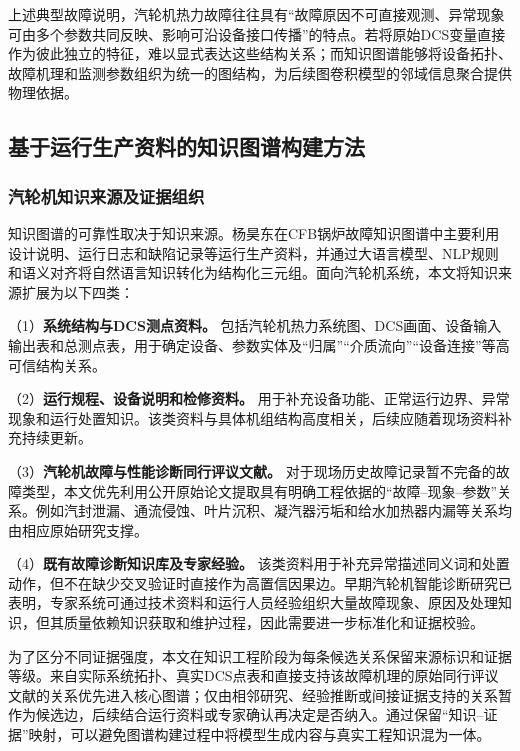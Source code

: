 上述典型故障说明，汽轮机热力故障往往具有“故障原因不可直接观测、异常现象可由多个参数共同反映、影响可沿设备接口传播”的特点。若将原始DCS变量直接作为彼此独立的特征，难以显式表达这些结构关系；而知识图谱能够将设备拓扑、故障机理和监测参数组织为统一的图结构，为后续图卷积模型的邻域信息聚合提供物理依据。

\subsection{基于运行生产资料的知识图谱构建方法}
\label{subsec:kg_construction_method}

\subsubsection{汽轮机知识来源及证据组织}

知识图谱的可靠性取决于知识来源。杨昊东在CFB锅炉故障知识图谱中主要利用设计说明、运行日志和缺陷记录等运行生产资料，并通过大语言模型、NLP规则和语义对齐将自然语言知识转化为结构化三元组\cite{YangHaodong2026CFB}。面向汽轮机系统，本文将知识来源扩展为以下四类：

（1）\textbf{系统结构与DCS测点资料。} 包括汽轮机热力系统图、DCS画面、设备输入输出表和总测点表，用于确定设备、参数实体及“归属”“介质流向”“设备连接”等高可信结构关系。

（2）\textbf{运行规程、设备说明和检修资料。} 用于补充设备功能、正常运行边界、异常现象和运行处置知识。该类资料与具体机组结构高度相关，后续应随着现场资料补充持续更新。

（3）\textbf{汽轮机故障与性能诊断同行评议文献。} 对于现场历史故障记录暂不完备的故障类型，本文优先利用公开原始论文提取具有明确工程依据的“故障--现象--参数”关系。例如汽封泄漏、通流侵蚀、叶片沉积、凝汽器污垢和给水加热器内漏等关系均由相应原始研究支撑\cite{Kubiak2002TurbineDegradation,Xu2011HPIPLeakage,Li2016CondenserFouling,Heo2012FWHLeakage}。

（4）\textbf{既有故障诊断知识库及专家经验。} 该类资料用于补充异常描述同义词和处置动作，但不在缺少交叉验证时直接作为高置信因果边。早期汽轮机智能诊断研究已表明，专家系统可通过技术资料和运行人员经验组织大量故障现象、原因及处理知识，但其质量依赖知识获取和维护过程，因此需要进一步标准化和证据校验。

为了区分不同证据强度，本文在知识工程阶段为每条候选关系保留来源标识和证据等级。来自实际系统拓扑、真实DCS点表和直接支持该故障机理的原始同行评议文献的关系优先进入核心图谱；仅由相邻研究、经验推断或间接证据支持的关系暂作为候选边，后续结合运行资料或专家确认再决定是否纳入。通过保留“知识--证据”映射，可以避免图谱构建过程中将模型生成内容与真实工程知识混为一体。

